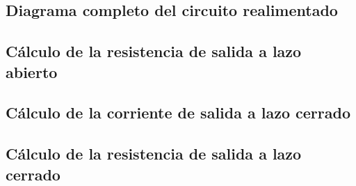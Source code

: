 \subsection{Diagrama completo del circuito realimentado}

\subsection{Cálculo de la resistencia de salida a lazo abierto}

\subsection{Cálculo de la corriente de salida a lazo cerrado}

\subsection{Cálculo de la resistencia de salida a lazo cerrado}